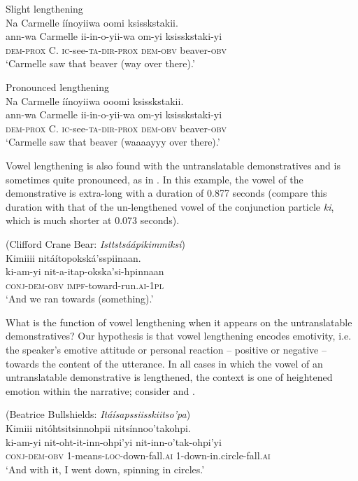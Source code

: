 \documentclass[output=paper,colorlinks,citecolor=brown]{langscibook}
\begin{document}
\ex Slight lengthening\\
  Na Carmelle íínoyiiwa oomi ksisskstakii.\\
\gll  ann-wa Carmelle ii-in-o-yii-wa om-yi ksisskstaki-yi  \\
     \textsc{dem-prox} C. \textsc{ic}-see-\textsc{ta-dir-prox} \textsc{dem-obv} beaver-\textsc{obv}\\
\glt ‘Carmelle saw that beaver (way over there).’

\ex Pronounced lengthening\\
  Na Carmelle íínoyiiwa ooomi ksisskstakii.\\
\gll  ann-wa Carmelle ii-in-o-yii-wa om-yi ksisskstaki-yi  \\
     \textsc{dem-prox} C. \textsc{ic}-see-\textsc{ta-dir-prox} \textsc{dem-obv} beaver-\textsc{obv}\\
\glt ‘Carmelle saw that beaver (waaaayyy over there).’
\z
\z

Vowel lengthening is also found with the untranslatable demonstratives and is sometimes quite pronounced, as in . In this example, the vowel of the demonstrative is extra-long with a duration of 0.877 seconds (compare this duration with that of the un-lengthened vowel of the conjunction particle \textit{ki}, which is much shorter at 0.073 seconds).

\ea\label{ex:bliss:18} (Clifford Crane Bear: \textit{Isttstsáápikimmiksi})\\
{Kimiiii nitáítopokská’sspiinaan.}\\
\gll ki-am-yi nit-a-itap-okska’si-hpinnaan\\
     \textsc{conj-dem-obv} \textsc{impf-}toward-run\textsc{.ai-1pl}\\
 ‘And we ran towards (something).’ 
\z

What is the function of vowel lengthening when it appears on the untranslatable demonstratives? Our hypothesis is that vowel lengthening encodes emotivity, i.e. the speaker’s emotive attitude or personal reaction – positive or negative – towards the content of the utterance. In all cases in which the vowel of an untranslatable demonstrative is lengthened, the context is one of heightened emotion within the narrative; consider  and .

\ea\label{ex:bliss:19} (Beatrice Bullshields: \textit{Itáísapssiisskiitso’pa})\\
{Kimiii nitóhtsitsinnohpii nitsínnoo’takohpi.}\\
\gll ki-am-yi nit-oht-it-inn-ohpi’yi nit-inn-o’tak-ohpi’yi\\
     \textsc{conj-dem-obv} \textsc{1-}means-\textsc{loc-}down-fall.\textsc{ai} \textsc{1}-down-in.circle-fall.\textsc{ai}\\
 ‘And with it, I went down, spinning in circles.’ 
\z
\end{document}
